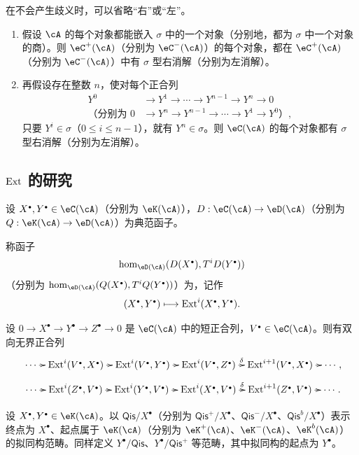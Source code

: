 在不会产生歧义时，可以省略“右”或“左”。
\begin{proposition}\label{VIII:3-1-9}
\begin{enumerate}
\item 假设 $\cA$ 的每个对象都能嵌入 $\sigma$ 中的一个对象（分别地，都为 $\sigma$ 中一个对象的商）。则 $\eC^+(\cA)$（分别为 $\eC^-(\cA)$）的每个对象，都在 $\eC^+(\cA)$（分别为 $\eC^-(\cA)$）中有 $\sigma$ 型右消解（分别为左消解）。
\item 再假设存在整数 $n$，使对每个正合列
\begin{align*}
Y^0&\to Y^1\to\cdots\to Y^{n-1}\to Y^n\to0\\
\text{（分别为 }0&\to Y^n\to Y^{n-1}\to\cdots\to Y^1\to Y^0\text{）},
\end{align*}
只要 $Y^i\in\sigma$（$0\leq i\leq n-1$），就有 $Y^n\in\sigma$。则 $\eC(\cA)$ 的每个对象都有 $\sigma$ 型右消解（分别为左消解）。
\end{enumerate}
\end{proposition}
\subsection{$\operatorname{Ext}$ 的研究}\label{VIII:3-2}
设 $X^\bullet,Y^\bullet\in\eC(\cA)$（分别为 $\eK(\cA)$），$D:\eC(\cA)\to\eD(\cA)$（分别为 $Q:\eK(\cA)\to\eD(\cA)$）为典范函子。
\begin{definition}\label{VIII:3-2-1}
称函子
\[\hom_{\eD(\cA)}(D(X^\bullet),T^iD(Y^\bullet))\]
（分别为 $\hom_{\eD(\cA)}(Q(X^\bullet),T^iQ(Y^\bullet))$）为，记作
\[(X^\bullet,Y^\bullet)\longmapsto\ext^i(X^\bullet,Y^\bullet).\]
\end{definition}
\begin{proposition}\label{VIII:3-2-2}
设 $0\to X^\bullet\to Y^\bullet\to Z^\bullet\to0$ 是 $\eC(\cA)$ 中的短正合列，$V^\bullet\in\eC(\cA)$。则有双向无界正合列
\[\xymatrix@C=6pt{
\cdots\ar[r]&\ext^i(V^\bullet,X^\bullet)\ar[r]&\ext^i(V^\bullet,Y^\bullet)\ar[r]&\ext^i(V^\bullet,Z^\bullet)\ar[r]^-\delta&\ext^{i+1}(V^\bullet,X^\bullet)\ar[r]&\cdots},\]
\[\xymatrix@C=6pt{
\cdots\ar[r]&\ext^i(Z^\bullet,V^\bullet)\ar[r]&\ext^i(Y^\bullet,V^\bullet)\ar[r]&\ext^i(X^\bullet,V^\bullet)\ar[r]^-\delta&\ext^{i+1}(Z^\bullet,V^\bullet)\ar[r]&\cdots}.\]
\end{proposition}
设 $X^\bullet,Y^\bullet\in\eK(\cA)$。以 $\mathsf{Qis}/X^\bullet$（分别为 $\mathsf{Qis}^+/X^\bullet$、$\mathsf{Qis}^-/X^\bullet$、$\mathsf{Qis}^b/X^\bullet$）表示终点为 $X^\bullet$、起点属于 $\eK(\cA)$（分别为 $\eK^+(\cA)$、$\eK^-(\cA)$、$\eK^b(\cA)$）的拟同构范畴。同样定义 $Y^\bullet/\mathsf{Qis}$、$Y^\bullet/\mathsf{Qis}^+$ 等范畴，其中拟同构的起点为 $Y^\bullet$。

